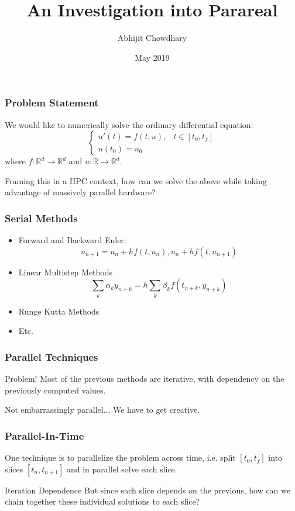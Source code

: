 \documentclass[pdf,12pt]{beamer}
\title{An Investigation into Parareal}
\author{Abhijit Chowdhary}
\institute{New York University}
\date{May 2019}
\begin{document}
 
\frame{\titlepage}

\begin{frame}
  \frametitle{Problem Statement}
  We would like to numerically solve the ordinary differential equation:
  \begin{equation*}
    \begin{cases}
      u'(t) = f(t, u), & t \in [t_0, t_f] \\
      u(t_0) = u_0
    \end{cases}
  \end{equation*}
  where $f : \mathbb{R}^d \to \mathbb{R}^d$ and $u: \mathbb{R} \to \mathbb{R}^d$.

  Framing this in a HPC context, how can we solve the above while taking
  advantage of massively parallel hardware?
\end{frame}

\begin{frame}
  \frametitle{Serial Methods}
  \begin{itemize}
    \item Forward and Backward Euler:
      \[
        u_{n+1} = u_n +  h f(t, u_n), u_n + h f(t,u_{n+1})
      \]
    \item Linear Multistep Methods
      \[
        \sum_k \alpha_k y_{n+k} = h\sum_k\beta_k f(t_{n+k},y_{n+k})
      \]
    \item Runge Kutta Methods
    \item Etc.
  \end{itemize}
\end{frame}

\begin{frame}
  \frametitle{Parallel Techniques}
  \begin{alertblock}{Problem!}
    Most of the previous methods are iterative, with dependency on the
    previously computed values.
  \end{alertblock}
  Not embarrassingly parallel... We have to get creative.
\end{frame}

\begin{frame}
  \frametitle{Parallel-In-Time}
  One technique is to parallelize the problem across time, i.e. split $[t_0,
  t_f]$ into slices $[t_n, t_{n+1}]$ and in parallel solve each slice.
  \begin{block}{Iteration Dependence}
    But since each slice depends on the previous, how can we chain together
    these individual solutions to each slice?
  \end{block}
\end{frame}
\end{document}
